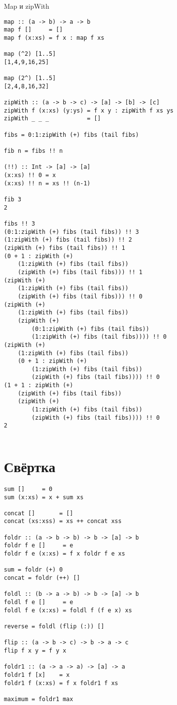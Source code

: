 \documentclass[a4paper,10pt]{article}
\begin{document}
Map и zipWith

\begin{lstlisting}
map :: (a -> b) -> a -> b
map f []     = []
map f (x:xs) = f x : map f xs

map (^2) [1..5]
[1,4,9,16,25]

map (2^) [1..5]
[2,4,8,16,32]

zipWith :: (a -> b -> c) -> [a] -> [b] -> [c]
zipWith f (x:xs) (y:ys) = f x y : zipWith f xs ys
zipWith _ _ _           = []

fibs = 0:1:zipWith (+) fibs (tail fibs)

fib n = fibs !! n

(!!) :: Int -> [a] -> [a]
(x:xs) !! 0 = x
(x:xs) !! n = xs !! (n-1)

fib 3
2

fibs !! 3
(0:1:zipWith (+) fibs (tail fibs)) !! 3
(1:zipWith (+) fibs (tail fibs)) !! 2
(zipWith (+) fibs (tail fibs)) !! 1
(0 + 1 : zipWith (+)
    (1:zipWith (+) fibs (tail fibs))
    (zipWith (+) fibs (tail fibs))) !! 1
(zipWith (+)
    (1:zipWith (+) fibs (tail fibs))
    (zipWith (+) fibs (tail fibs))) !! 0
(zipWith (+)
    (1:zipWith (+) fibs (tail fibs))
    (zipWith (+)
        (0:1:zipWith (+) fibs (tail fibs))
        (1:zipWith (+) fibs (tail fibs)))) !! 0
(zipWith (+)
    (1:zipWith (+) fibs (tail fibs))
    (0 + 1 : zipWith (+)
        (1:zipWith (+) fibs (tail fibs))
        (zipWith (+) fibs (tail fibs)))) !! 0
(1 + 1 : zipWith (+)
    (zipWith (+) fibs (tail fibs))
    (zipWith (+)
        (1:zipWith (+) fibs (tail fibs))
        (zipWith (+) fibs (tail fibs)))) !! 0
2


\end{lstlisting}

\section{Свёртка}

\begin{lstlisting}
sum []     = 0
sum (x:xs) = x + sum xs

concat []       = []
concat (xs:xss) = xs ++ concat xss

foldr :: (a -> b -> b) -> b -> [a] -> b
foldr f e []     = e
foldr f e (x:xs) = f x foldr f e xs

sum = foldr (+) 0
concat = foldr (++) []

foldl :: (b -> a -> b) -> b -> [a] -> b
foldl f e []     = e
foldl f e (x:xs) = foldl f (f e x) xs

reverse = foldl (flip (:)) []

flip :: (a -> b -> c) -> b -> a -> c
flip f x y = f y x

foldr1 :: (a -> a -> a) -> [a] -> a
foldr1 f [x]    = x
foldr1 f (x:xs) = f x foldr1 f xs

maximum = foldr1 max

\end{lstlisting}
\end{document}
